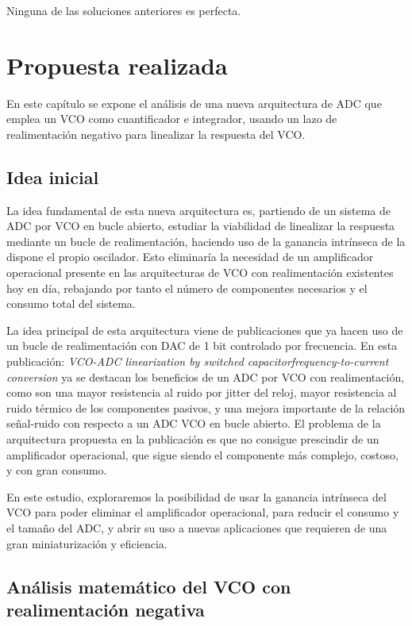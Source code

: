 \documentclass[12pt]{report} %
\begin{document}
	Ninguna de las soluciones anteriores es perfecta. %
	
\chapter{Propuesta realizada}
	
	En este capítulo se expone el análisis de una nueva arquitectura de ADC que emplea un VCO como cuantificador e integrador, usando un lazo de realimentación negativo para linealizar la respuesta del VCO.
	
	\section{Idea inicial}\label{sc:initial-idea}
	
	La idea fundamental de esta nueva arquitectura es, partiendo de un sistema de ADC por VCO en bucle abierto, estudiar la viabilidad de linealizar la respuesta mediante un bucle de realimentación, haciendo uso de la ganancia intrínseca de la dispone el propio oscilador. Esto eliminaría la necesidad de un amplificador operacional presente en las arquitecturas de VCO con realimentación existentes hoy en día, rebajando por tanto el número de componentes necesarios y el consumo total del sistema.
	
	La idea principal de esta arquitectura viene de publicaciones que ya hacen uso de un bucle de realimentación con DAC de 1 bit controlado por frecuencia. En esta publicación: \textit{VCO-ADC linearization by switched capacitorfrequency-to-current conversion}\cite{vco-adc-ruben-eric} ya se destacan los beneficios de un ADC por VCO con realimentación, como son una mayor resistencia al ruido por jitter del reloj, mayor resistencia al ruido térmico de los componentes pasivos, y una mejora importante de la relación señal-ruido con respecto a un ADC VCO en bucle abierto. El problema de la arquitectura propuesta en la publicación es que no consigue prescindir de un amplificador operacional, que sigue siendo el componente más complejo, costoso, y con gran consumo.
	
	En este estudio, exploraremos la posibilidad de usar la ganancia intrínseca del VCO para poder eliminar el amplificador operacional, para reducir el consumo y el tamaño del ADC, y abrir su uso a nuevas aplicaciones que requieren de una gran miniaturización y eficiencia.
	
	
	\section{Análisis matemático del VCO con realimentación negativa}
	
\end{document}
